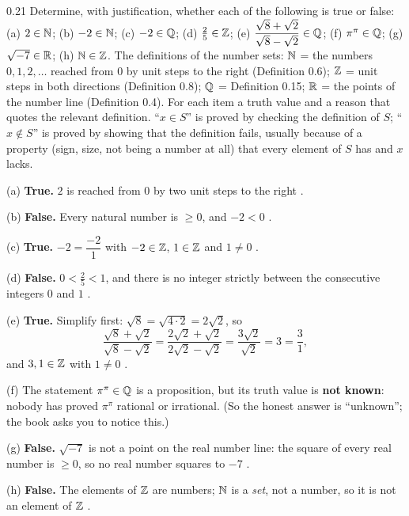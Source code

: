 \begin{bookex}[essential]{0.21}
Determine, with justification, whether each of the following is true or false: (a) $2\in\mathbb{N}$; (b) $-2\in\mathbb{N}$; (c) $-2\in\mathbb{Q}$; (d) $\frac25\in\mathbb{Z}$; (e) $\dfrac{\sqrt8+\sqrt2}{\sqrt8-\sqrt2}\in\mathbb{Q}$; (f) $\pi^\pi\in\mathbb{Q}$; (g) $\sqrt{-7}\in\mathbb{R}$; (h) $\mathbb{N}\in\mathbb{Z}$.
\solution
\given The definitions of the number sets: $\mathbb{N}$ = the numbers $0,1,2,\dots$ reached from $0$ by unit steps to the right (Definition 0.6); $\mathbb{Z}$ = unit steps in both directions (Definition 0.8); $\mathbb{Q}$ = Definition 0.15; $\mathbb{R}$ = the points of the number line (Definition 0.4).
\goal For each item a truth value and a reason that quotes the relevant definition.
\plan ``$x\in S$'' is proved by checking the definition of $S$; ``$x\notin S$'' is proved by showing that the definition fails, usually because of a property (sign, size, not being a number at all) that every element of $S$ has and $x$ lacks.
\begin{steps}
\item (a) \textbf{True.} $2$ is reached from $0$ by two unit steps to the right .
\item (b) \textbf{False.} Every natural number is $\ge0$, and $-2<0$ .
\item (c) \textbf{True.} $-2=\dfrac{-2}{1}$ with $-2\in\mathbb{Z}$, $1\in\mathbb{Z}$ and $1\ne0$ .
\item (d) \textbf{False.} $0<\frac25<1$, and there is no integer strictly between the consecutive integers $0$ and $1$ .
\item (e) \textbf{True.} Simplify first: $\sqrt8=\sqrt{4\cdot2}=2\sqrt2$, so
\[
\frac{\sqrt8+\sqrt2}{\sqrt8-\sqrt2}=\frac{2\sqrt2+\sqrt2}{2\sqrt2-\sqrt2}=\frac{3\sqrt2}{\sqrt2}=3=\frac31 ,
\]
and $3,1\in\mathbb{Z}$ with $1\ne0$ .
\item (f) The statement $\pi^\pi\in\mathbb{Q}$ is a proposition, but its truth value is \textbf{not known}: nobody has proved $\pi^\pi$ rational or irrational. (So the honest answer is ``unknown''; the book asks you to notice this.)
\item (g) \textbf{False.} $\sqrt{-7}$ is not a point on the real number line: the square of every real number is $\ge0$, so no real number squares to $-7$ .
\item (h) \textbf{False.} The elements of $\mathbb{Z}$ are numbers; $\mathbb{N}$ is a \emph{set}, not a number, so it is not an element of $\mathbb{Z}$ .

\end{steps}
\end{bookex}
